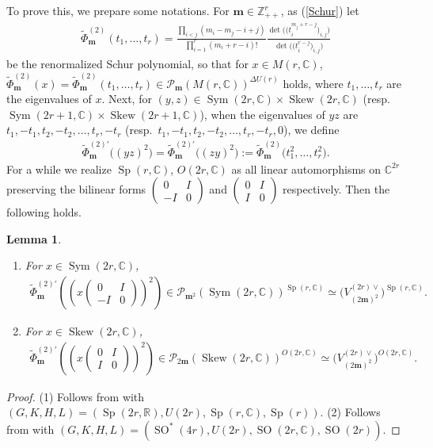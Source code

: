 \documentclass[pdftex]{sigma}
\numberwithin{equation}{section}
\newtheorem{Lemma}[Theorem]{Lemma}
\newcommand{\bm}{\mathbf{m}}
\newcommand{\BZ}{\mathbb{Z}}
\newcommand{\BR}{\mathbb{R}}
\newcommand{\BC}{\mathbb{C}}
\newcommand{\cP}{\mathcal{P}}
\newcommand{\Sym}{\operatorname{Sym}}
\newcommand{\Skew}{\operatorname{Skew}}
\begin{document}
To prove this, we prepare some notations. For $\bm\in\BZ_{++}^r$, as (\ref{Schur}) let
\begin{gather}\label{Schur2}
\tilde{\Phi}_\bm^{(2)}(t_1,\ldots,t_r)=\frac{\prod\limits_{i<j}(m_i-m_j-i+j)}{\prod\limits_{i=1}^r (m_i+r-i)!}
\frac{\det\big(\big(t_i^{m_j+r-j}\big)_{i,j}\big)}{\det\big(\big(t_i^{r-j}\big)_{i,j}\big)}
\end{gather}
be the renormalized Schur polynomial, so that for $x\in M(r,\BC)$, $\tilde{\Phi}_\bm^{(2)}(x)=\tilde{\Phi}_\bm^{(2)}(t_1,\ldots,t_r)
\in\cP_\bm(M(r,\BC))^{\Delta U(r)}$ holds, where $t_1,\ldots,t_r$ are the eigenvalues of $x$.
Next, for $(y,z)\in \Sym(2r,\BC)\times\Skew(2r,\BC)$ (resp.~$\Sym(2r+1,\BC)\times\Skew(2r+1,\BC)$), when the eigenvalues of $yz$ are
$t_1,-t_1,t_2,\allowbreak-t_2,\ldots,t_r,-t_r$ (resp.~$t_1,-t_1,t_2,-t_2,\ldots,t_r,-t_r,0$), we define
\begin{gather}\label{Schur3}
\tilde{\Phi}_\bm^{(2)\prime}\big((yz)^2\big)=\tilde{\Phi}_\bm^{(2)\prime}\big((zy)^2\big):=\tilde{\Phi}_\bm^{(2)}\big(t_1^2,\ldots,t_r^2\big).
\end{gather}
For a while we realize $\operatorname{Sp}(r,\BC)$, $O(2r,\BC)$ as all linear automorphisms on $\BC^{2r}$
preserving the bilinear forms $\left(\begin{smallmatrix}0&I\\-I&0\end{smallmatrix}\right)$ and
$\left(\begin{smallmatrix}0&I\\I&0\end{smallmatrix}\right)$ respectively. Then the following holds.
\begin{Lemma}\quad
\begin{enumerate}\itemsep=0pt
\item[$(1)$] For $x\in\Sym(2r,\BC)$,
\begin{gather*} \tilde{\Phi}_\bm^{(2)\prime}\left(\left(x\begin{pmatrix}0&I\\-I&0\end{pmatrix}\right)^2\right)
\in\cP_{\bm^2}(\Sym(2r,\BC))^{\operatorname{Sp}(r,\BC)}\simeq \big(V_{(2\bm)^2}^{(2r)\vee}\big)^{\operatorname{Sp}(r,\BC)}. \end{gather*}
\item[$(2)$] For $x\in\Skew(2r,\BC)$,
\begin{gather*} \tilde{\Phi}_\bm^{(2)\prime}\left(\left(x\begin{pmatrix}0&I\\I&0\end{pmatrix}\right)^2\right)
\in\cP_{2\bm}(\Skew(2r,\BC))^{O(2r,\BC)}\simeq \big(V_{(2\bm)^2}^{(2r)\vee}\big)^{O(2r,\BC)}. \end{gather*}
\end{enumerate}
\end{Lemma}
\begin{proof}
(1) Follows from \cite[Proposition 7.6]{Z} with $(G,K,H,L)=(\operatorname{Sp}(2r,\BR),U(2r),\operatorname{Sp}(r,\BC),\allowbreak \operatorname{Sp}(r))$.
(2) Follows from \cite[Proposition 8.3]{Z} with $(G,K,H,L)=(\operatorname{SO}^*(4r),U(2r),\operatorname{SO}(2r,\BC),\allowbreak \operatorname{SO}(2r))$.
\end{proof}
\end{document}
